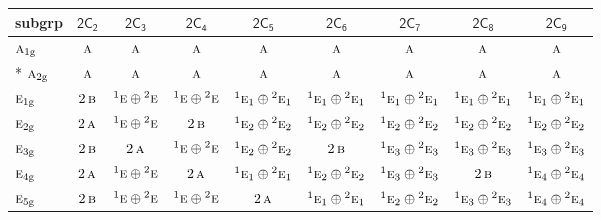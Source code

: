 \documentclass[10pt,a4paper]{article}
\numberwithin{equation}{section}
\newcommand{\grp}[1]{\mathsf{#1}}
\newcommand{\irr}[1]{\text{\normalfont\scshape #1}}
\newcommand{\conjpair}[1]{{}^{#1}}
\newcommand{\ptag}[1]{\mathrm{#1}}
\begin{document}
{\small\begin{longtable}{@{}lcccccccc@{}}\toprule
subgrp & \href{2C2.pdf}{$\grp{2C_{2}}$} & \href{2C3.pdf}{$\grp{2C_{3}}$} & \href{2C4.pdf}{$\grp{2C_{4}}$} & \href{2C5.pdf}{$\grp{2C_{5}}$} & \href{2C6.pdf}{$\grp{2C_{6}}$} & \href{2C7.pdf}{$\grp{2C_{7}}$} & \href{2C8.pdf}{$\grp{2C_{8}}$} & \href{2C9.pdf}{$\grp{2C_{9}}$}\\\midrule\endhead
\bottomrule\endfoot\endlastfoot
$\irr{a}_{1\ptag{g}}$ & $\irr{a}$ & $\irr{a}$ & $\irr{a}$ & $\irr{a}$ & $\irr{a}$ & $\irr{a}$ & $\irr{a}$ & $\irr{a}$\\*
$\irr{a}_{2\ptag{g}}$ & $\irr{a}$ & $\irr{a}$ & $\irr{a}$ & $\irr{a}$ & $\irr{a}$ & $\irr{a}$ & $\irr{a}$ & $\irr{a}$\\
$\irr{e}_{1\ptag{g}}$ & $2\,\irr{b}$ & $\conjpair{1}\irr{e}\oplus \conjpair{2}\irr{e}$ & $\conjpair{1}\irr{e}\oplus \conjpair{2}\irr{e}$ & $\conjpair{1}\irr{e}_{1}\oplus \conjpair{2}\irr{e}_{1}$ & $\conjpair{1}\irr{e}_{1}\oplus \conjpair{2}\irr{e}_{1}$ & $\conjpair{1}\irr{e}_{1}\oplus \conjpair{2}\irr{e}_{1}$ & $\conjpair{1}\irr{e}_{1}\oplus \conjpair{2}\irr{e}_{1}$ & $\conjpair{1}\irr{e}_{1}\oplus \conjpair{2}\irr{e}_{1}$\\
$\irr{e}_{2\ptag{g}}$ & $2\,\irr{a}$ & $\conjpair{1}\irr{e}\oplus \conjpair{2}\irr{e}$ & $2\,\irr{b}$ & $\conjpair{1}\irr{e}_{2}\oplus \conjpair{2}\irr{e}_{2}$ & $\conjpair{1}\irr{e}_{2}\oplus \conjpair{2}\irr{e}_{2}$ & $\conjpair{1}\irr{e}_{2}\oplus \conjpair{2}\irr{e}_{2}$ & $\conjpair{1}\irr{e}_{2}\oplus \conjpair{2}\irr{e}_{2}$ & $\conjpair{1}\irr{e}_{2}\oplus \conjpair{2}\irr{e}_{2}$\\
$\irr{e}_{3\ptag{g}}$ & $2\,\irr{b}$ & $2\,\irr{a}$ & $\conjpair{1}\irr{e}\oplus \conjpair{2}\irr{e}$ & $\conjpair{1}\irr{e}_{2}\oplus \conjpair{2}\irr{e}_{2}$ & $2\,\irr{b}$ & $\conjpair{1}\irr{e}_{3}\oplus \conjpair{2}\irr{e}_{3}$ & $\conjpair{1}\irr{e}_{3}\oplus \conjpair{2}\irr{e}_{3}$ & $\conjpair{1}\irr{e}_{3}\oplus \conjpair{2}\irr{e}_{3}$\\
$\irr{e}_{4\ptag{g}}$ & $2\,\irr{a}$ & $\conjpair{1}\irr{e}\oplus \conjpair{2}\irr{e}$ & $2\,\irr{a}$ & $\conjpair{1}\irr{e}_{1}\oplus \conjpair{2}\irr{e}_{1}$ & $\conjpair{1}\irr{e}_{2}\oplus \conjpair{2}\irr{e}_{2}$ & $\conjpair{1}\irr{e}_{3}\oplus \conjpair{2}\irr{e}_{3}$ & $2\,\irr{b}$ & $\conjpair{1}\irr{e}_{4}\oplus \conjpair{2}\irr{e}_{4}$\\
$\irr{e}_{5\ptag{g}}$ & $2\,\irr{b}$ & $\conjpair{1}\irr{e}\oplus \conjpair{2}\irr{e}$ & $\conjpair{1}\irr{e}\oplus \conjpair{2}\irr{e}$ & $2\,\irr{a}$ & $\conjpair{1}\irr{e}_{1}\oplus \conjpair{2}\irr{e}_{1}$ & $\conjpair{1}\irr{e}_{2}\oplus \conjpair{2}\irr{e}_{2}$ & $\conjpair{1}\irr{e}_{3}\oplus \conjpair{2}\irr{e}_{3}$ & $\conjpair{1}\irr{e}_{4}\oplus \conjpair{2}\irr{e}_{4}$\\

\end{longtable}}
\end{document}
